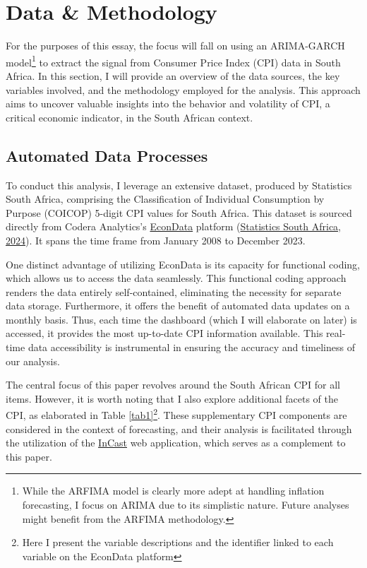 \documentclass[11pt,preprint, authoryear]{elsarticle}
\numberwithin{equation}{section}
\numberwithin{figure}{section}
\numberwithin{table}{section}
\let\rmarkdownfootnote\footnote%
\def\footnote{\protect\rmarkdownfootnote}
\begin{document}
\hypertarget{data-methodology}{%
\section{\texorpdfstring{Data \& Methodology
\label{Meth}}{Data \& Methodology }}\label{data-methodology}}

For the purposes of this essay, the focus will fall on using an
ARIMA-GARCH model\footnote{While the ARFIMA model is clearly more adept
  at handling inflation forecasting, I focus on ARIMA due to its
  simplistic nature. Future analyses might benefit from the ARFIMA
  methodology.} to extract the signal from Consumer Price Index (CPI)
data in South Africa. In this section, I will provide an overview of the
data sources, the key variables involved, and the methodology employed
for the analysis. This approach aims to uncover valuable insights into
the behavior and volatility of CPI, a critical economic indicator, in
the South African context.

\hypertarget{automated-data-processes}{%
\subsection{Automated Data Processes}\label{automated-data-processes}}

To conduct this analysis, I leverage an extensive dataset, produced by
Statistics South Africa, comprising the Classification of Individual
Consumption by Purpose (COICOP) 5-digit CPI values for South Africa.
This dataset is sourced directly from Codera Analytics's
\href{https://www.econdata.co.za/app}{EconData} platform
(\protect\hyperlink{ref-data}{Statistics South Africa, 2024}). It spans
the time frame from January 2008 to December 2023.

One distinct advantage of utilizing EconData is its capacity for
functional coding, which allows us to access the data seamlessly. This
functional coding approach renders the data entirely self-contained,
eliminating the necessity for separate data storage. Furthermore, it
offers the benefit of automated data updates on a monthly basis. Thus,
each time the dashboard (which I will elaborate on later) is accessed,
it provides the most up-to-date CPI information available. This
real-time data accessibility is instrumental in ensuring the accuracy
and timeliness of our analysis.

The central focus of this paper revolves around the South African CPI
for all items. However, it is worth noting that I also explore
additional facets of the CPI, as elaborated in Table
\ref{tab1}\footnote{Here I present the variable descriptions and the
  identifier linked to each variable on the EconData platform}. These
supplementary CPI components are considered in the context of
forecasting, and their analysis is facilitated through the utilization
of the \href{https://janpretorius.shinyapps.io/incast/}{InCast} web
application, which serves as a complement to this paper.
\end{document}
